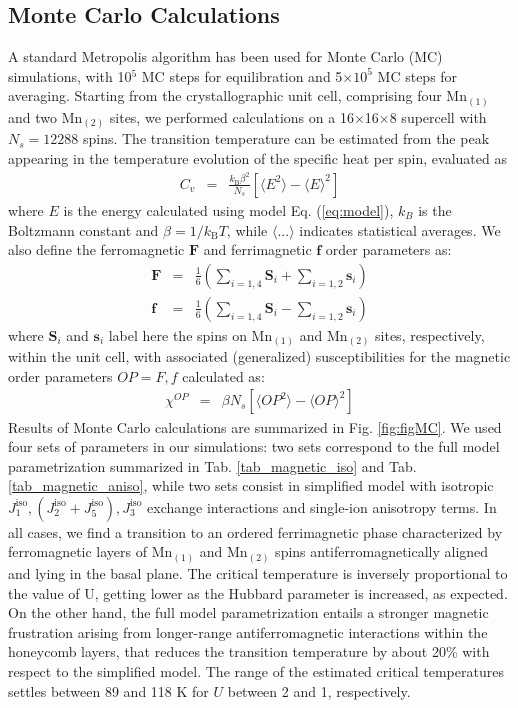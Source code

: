 \documentclass[preprint,amsmath,amssymb,aps,nofootinbib,superscriptaddress]{revtex4-2}
\begin{document}
\subsection{Monte Carlo Calculations}
A standard Metropolis algorithm has been used for Monte Carlo (MC) simulations, with 10$^5$ MC steps for equilibration and 5$\times 10^5$ MC steps for averaging. Starting from the crystallographic unit cell, comprising four Mn$_{(1)}$ and two Mn$_{(2)}$ sites, we performed calculations on a 16$\times$16$\times$8 supercell with $N_s=12288$ spins. The transition temperature can be estimated from the peak appearing in the temperature evolution of the specific heat per spin, evaluated as
\begin{eqnarray}\label{cv}
C_v &=&\frac{k_\mathrm{B}\beta^2}{N_s}\left[\langle E^2\rangle - \langle E\rangle^2 \right]
\end{eqnarray}
where $E$ is the energy calculated using model Eq. (\ref{eq:model}), $k_B$ is the Boltzmann constant and $\beta=1/k_\mathrm{B}T$, while $\langle ...\rangle$ indicates statistical averages. We also define the ferromagnetic $\bm F$ and ferrimagnetic $\bm f$ order parameters as:
\begin{eqnarray}
{\bm F} &=& \frac{1}{6}\left(\sum_{i=1,4} \bm S_i + \sum_{i=1,2} \bm s_i\right)\nonumber\\
{\bm f} &=& \frac{1}{6}\left(\sum_{i=1,4} \bm S_i - \sum_{i=1,2} \bm s_i\right)
\end{eqnarray}
where $\bm S_i$ and $\bm s_i$ label here the spins on Mn$_{(1)}$ and Mn$_{(2)}$ sites, respectively, within the unit cell, with associated (generalized) susceptibilities for the magnetic order parameters $OP=F,f$ calculated as:
\begin{eqnarray}
\chi^{OP} &=&\beta N_s \left[\langle OP^2\rangle - \langle OP\rangle^2  \right]
\end{eqnarray}
Results of Monte Carlo calculations are summarized in Fig. \ref{fig:figMC}. We used four sets of parameters in our simulations: two sets correspond to the full model parametrization summarized in Tab. \ref{tab_magnetic_iso} and Tab. \ref{tab_magnetic_aniso}, while two sets consist in simplified model with isotropic $J_1^{\mathrm{iso}}, (J_2^{\mathrm{iso}}+J_5^{\mathrm{iso}}),J_3^{\mathrm{iso}}$ exchange interactions and single-ion anisotropy terms. In all cases, we find a transition to an ordered ferrimagnetic phase characterized by ferromagnetic layers of Mn$_{(1)}$ and Mn$_{(2)}$ spins antiferromagnetically aligned and lying in the basal plane. The critical temperature is inversely proportional to the value of U, getting lower as the Hubbard parameter is increased, as expected. On the other hand, the full model parametrization entails a stronger magnetic frustration arising from longer-range antiferromagnetic interactions within the honeycomb layers, that reduces the transition temperature by about 20\% with respect to the simplified model. The range of the estimated critical temperatures settles between 89 and 118 K for $U$ between 2 and 1, respectively.
\end{document}

